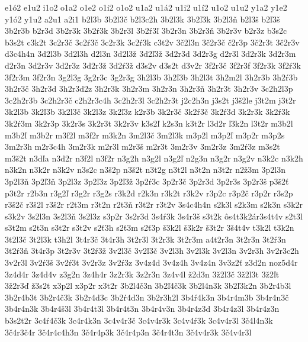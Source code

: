 {e1\'o2
e1u2
i1o2
o1a2
o1e2
o1i2
o1o2
u1a2
u1\'a2
u1i2
u1\'i2
u1o2
u1u2
y1a2
y1e2
y1\'o2
y1u2
a2u1
a2i1
b2l3b
3b2l3\v c
b2l3c2h
3b2l3k
3b2\v l3k
3b2l3\v n
b2l3\v s
b2\v l3\v s
3b2r3b
b2r3d
3b2r3k
3b2\'r3k
3b2r3l
3b2\'r3\v l
3b2r3n
3b2r3\v n
3b2r3v
b2r3z
b3s2c
b3s2t
c3k2t
3c2r3\v c
3c2\'r3\v c
3c2r3k
3c2\'r3k
c3t2v
3\v c2l3n
3\v c2r3\v c
\v c2r3p
3\v c2r3t
3\v c2r3v
d3c4h4n
3d2l3b
3d2l3h
d2l3n
3d2l3\v z
3d2\v l3\v z
3d2r3d
3d2r3g
d2r3l
3d2r3k
3d2r3m
d2r3n
3d2r3v
3d2r3z
3d2r3\v z
3d2\'r3\v z
d3s2v
d3s2t
d3v2r
3f2r3\v c
3f2r3f
3f2r3k
3f2\'r3k
3f2r3m
3f2r3n
3g2l3g
3g2r3c
3g2r3g
3h2l3b
3h2\v l3b
3h2l3t
3h2m2l
3h2r3b
3h2\'r3b
3h2r3\v c
3h2r3d
3h2r3d2z
3h2r3k
3h2r3m
3h2r3n
3h2r3\v n
3h2r3t
3h2r3v
3c2h2l3p
3c2h2r3b
3c2h2r3\v c
c2h2r3c4h
3c2h2r3l
3c2h2r3t
j2c2h3n
j3s2t
j3\v s2le
j3t2m
j3t2r
3k2l3b
3k2\v l3b
3k2l3\v c
3k2l3z
3k2\v l3z
k2r3b
3k2r3\v c
3k2\'r3\v c
3k2\'r3d
3k2r3k
3k2\'r3k
3k2\'r3m
3k2r3p
3k2r3s
3k2r3t
3k2r3v
k3s2\v l
k2s3n
k3t2r
l3d2r
\v l3k2n
l3t2r
m3b2l
m3b2\v l
m3b2r
m3f2l
m3f2r
m3k2n
3m2l3\v c
3m2l3k
m3p2l
m3p2\v l
m3p2r
m3p2s
3m2r3h
m2r3c4h
3m2r3k
m2r3l
m2r3\v s
m2r3t
3m2r3v
3m2r3z
3m2\'r3z
m3s2t
m3\v s2t
n3d\v la
n3d2r
n3f2l
n3f2r
n3g2h
n3g2l
n3g2\v l
n2g3n
n3g2r
n3g2v
n3k2c
n3k2h
n3k2n
n3k2r
n3k2v
n3s2c
n3\v s2p
n3\v s2t
n3t2g
n3t2l
n3t2n
n3t2r
n2\v z3m
3p2l3n
3p2l3\v n
3p2\v l3\v n
3p2l3z
3p2\v l3z
3p2\v l3\v z
3p2\'r3c
3p2r3\v c
3p2r3d
3p2r3s
3p2r3\v s
p3\v s2\v t
p3t2r
r2b3n
r3g2\v l
r3g2r
r3g2s
r3k2d
r2k3n
r3k2t
r3k2v
r3p2c
r3p2\v c
r3p2r
r3s2p
r3\v s2\v c
r3\v s2l
r3\v s2r
r2t3m
r3t2n
r2t3\v n
r3t2r
r3t2v
3s4c4h4n
s2k3l
s2k3m
s2k3n
s3k2r
s3k2v
3s2l3n
3s2l3\v n
3s2l3z
s3p2r
3s2r3d
3s4\'r3k
3s4r3\v s
s3t2k
\^os4t3k2\'ar3s4t4v
s2t3l
s3t2m
s2t3n
s3t2r
s3t2v
s2\v t3h
s2\v t3m
s2\v t3p
\v s3k2l
\v s3k2r
\v s3t2r
3\v s4t4v
t3k2l
t3k2n
3t2l3\v c
3t2l3k
t3h2l
3t4r3\v c
3t4r3h
3t2r3l
3t2r3k
3t2r3m
a4t2r3n
3t2r3n
3t2\'r3n
3t2\'r3\v n
3t4r3p
3t2r3v
3t2\'r3\v z
3v2l3\v c
3v2\v l3\v c
3v2l3h
3v2l3k
3v2l3n
3v2r3h
3v2r3c2h
3v2r3l
3v2\'r3\v s
3v2\'r3t
3v2r3z
3v2\'r3z
3v4z4d
3v4z4h
3v4z4n
3v3z2\v t
z3d2n
noz5d4r
3z4d4r
3z4d4v
z3g2n
3z4h4r
3z2r3k
3z2r3n
3z4v4l
\v z2d3n
3\v z2l3\v c
3\v z2l3t
3\v z2\v lt
3\v z2r3\v d
\v z3s2t
x3p2l
x3p2r
x3t2r
3b2l4\v c3n
3b2\v l4\v c3k
3b2l4n3k
3b2\v l3k2n
3b2r4b3l
3b2r4b3t
3b2r4\v c3k
3b2r4d3c
3b2\'r4d3n
3b2r3h2l
3b4\'r4k3n
3b4r4m3b
3b4r4n3\v c
3b4r4n3k
3b4r4\v s3l
3b4r4t3l
3b4r4t3n
3b4r4v3n
3b4r4z3d
3b4r4z3l
3b4r4z3n
b3s2t2r
3c4\'r4\v c3k
3c4r4k3n
3c4v4r3\v c
3c4v4r3k
3c4v4\'r3k
3c4v4r3l
3\v c4l4n3k
3\v c4r3\v c4r
3\v c4r4c4h3n
3\v c4r4p3k
3\v c4r4p3n
3\v c4r4t3n
3\v c4v4r3k
3\v c4v4r3l
}
